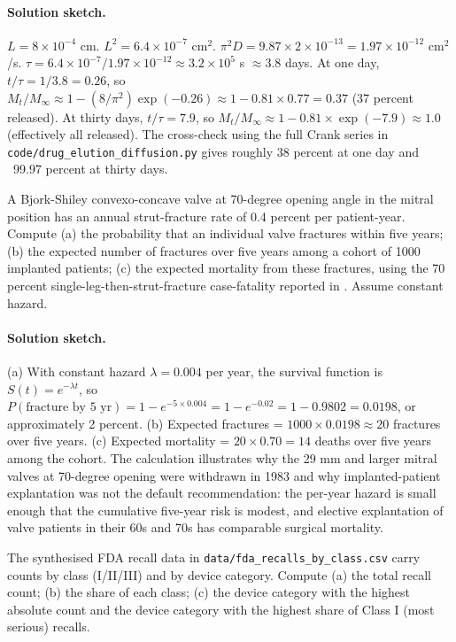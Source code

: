 \paragraph{Solution sketch.}
$L = 8 \times 10^{-4}$ cm. $L^2 = 6.4 \times 10^{-7}$ cm$^2$.
$\pi^2 D = 9.87 \times 2 \times 10^{-13} = 1.97 \times 10^{-12}$
cm$^2$/s. $\tau = 6.4 \times 10^{-7} / 1.97 \times 10^{-12}
\approx 3.2 \times 10^5$ s $\approx 3.8$ days. At one day,
$t/\tau = 1/3.8 = 0.26$, so $M_t/M_\infty \approx 1 - (8/\pi^2)
\exp(-0.26) \approx 1 - 0.81 \times 0.77 = 0.37$ (37 percent
released). At thirty days, $t/\tau = 7.9$, so $M_t/M_\infty
\approx 1 - 0.81 \times \exp(-7.9) \approx 1.0$ (effectively all
released). The cross-check using the full Crank series in
\texttt{code/drug\_elution\_diffusion.py} gives roughly 38 percent
at one day and ~99.97 percent at thirty days.

\begin{exercise}
A Bjork-Shiley convexo-concave valve at 70-degree opening angle in
the mitral position has an annual strut-fracture rate of
0.4 percent per patient-year. Compute (a) the probability that an
individual valve fractures within five years; (b) the expected
number of fractures over five years among a cohort of 1000
implanted patients; (c) the expected mortality from these
fractures, using the 70 percent single-leg-then-strut-fracture
case-fatality reported in \cite{paper:v6c12-blot-bjork-shiley-2005}.
Assume constant hazard.
\end{exercise}

\paragraph{Solution sketch.}
(a) With constant hazard $\lambda = 0.004$ per year, the survival
function is $S(t) = e^{-\lambda t}$, so $P(\text{fracture by 5 yr})
= 1 - e^{-5 \times 0.004} = 1 - e^{-0.02} = 1 - 0.9802 = 0.0198$,
or approximately 2 percent. (b) Expected fractures = $1000 \times
0.0198 \approx 20$ fractures over five years. (c) Expected
mortality = $20 \times 0.70 = 14$ deaths over five years among
the cohort. The calculation illustrates why the 29 mm and larger
mitral valves at 70-degree opening were withdrawn in 1983 and
why implanted-patient explantation was not the default
recommendation: the per-year hazard is small enough that the
cumulative five-year risk is modest, and elective explantation of
valve patients in their 60s and 70s has comparable surgical
mortality.

\begin{exercise}
The synthesised FDA recall data in
\texttt{data/fda\_recalls\_by\_class.csv} carry counts by class
(I/II/III) and by device category. Compute (a) the total recall
count; (b) the share of each class; (c) the device category with
the highest absolute count and the device category with the highest
share of Class I (most serious) recalls.
\end{exercise}

